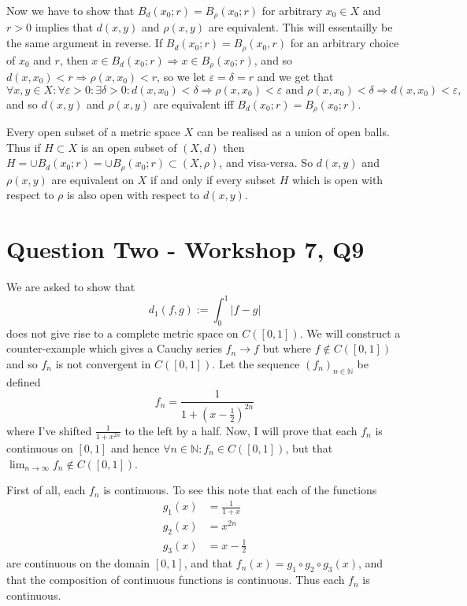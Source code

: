 \documentclass{article}
\def \N {\mathbb{N}}
\begin{document}
Now we have to show that $B_d(x_0;r)=B_\rho(x_0;r)$ for arbitrary $x_0\in X$ and $r>0$ implies that $d(x,y)$ and $\rho(x,y)$ are equivalent. This will essentailly be the same argument in reverse. If $B_d(x_0;r)=B_\rho(x_0,r)$ for an arbitrary choice of $x_0$ and $r$, then $x\in B_d(x_0;r) \Rightarrow x\in B_\rho(x_0;r)$, and so $d(x,x_0)<r \Rightarrow \rho(x,x_0)<r$, so we let $\varepsilon=\delta=r$ and we get that
	\[
		\forall x,y\in X: \forall\varepsilon>0:\exists\delta>0:
		d(x,x_0)<\delta \Rightarrow \rho(x,x_0)<\varepsilon
		\text{ and }
		\rho(x,x_0)<\delta \Rightarrow d(x,x_0)<\varepsilon,
	\]
and so $d(x,y)$ and $\rho(x,y)$ are equivalent iff $B_d(x_0;r)=B_\rho(x_0;r)$.

Every open subset of a metric space $X$ can be realised as a union of open balls. Thus if $H\subset X$ is an open subset of $(X,d)$ then $H=\cup B_d(x_0;r) = \cup B_\rho(x_0;r) \subset (X,\rho)$, and visa-versa. So $d(x,y)$ and $\rho(x,y)$ are equivalent on $X$ if and only if every subset $H$ which is open with respect to $\rho$ is also open with respect to $d(x,y)$.


\section*{Question Two - Workshop 7, Q9}
We are asked to show that
	\[
		d_1(f,g) := \int_0^1 |f-g|
	\]
does not give rise to a complete metric space on $C([0,1])$. We will construct a counter-example which gives a Cauchy series $f_n\to f$ but where $f\notin C([0,1])$ and so $f_n$ is not convergent in $C([0,1])$. Let the sequence $(f_n)_{n\in\N}$ be defined
	\begin{equation}\label{f}
		f_n = \frac{1}{1+(x-\frac12)^{2n}}
	\end{equation}
where I've shifted $\frac{1}{1+x^{2n}}$ to the left by a half. Now, I will prove that each $f_n$ is continuous on $[0,1]$ and hence $\forall n\in\N: f_n\in C([0,1])$, but that $\lim_{n\to\infty}f_n \notin C([0,1])$.

First of all, each $f_n$ is continuous. To see this note that each of the functions
	\begin{align*}
		g_1(x) &= \frac{1}{1+x}\\
		g_2(x) &= x^{2n}\\
		g_3(x) &= x-\frac12
	\end{align*}
are continuous on the domain $[0,1]$, and that $f_n(x) = g_1\circ g_2\circ g_3 (x)$, and that the composition of continuous functions is continuous. Thus each $f_n$ is continuous.
\end{document}
